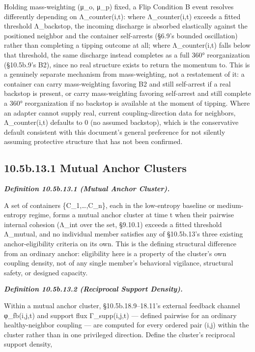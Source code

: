 \documentclass[
]{article}
\begin{document}
Holding mass-weighting (μ\_o, μ\_p) fixed, a Flip Condition B event
resolves differently depending on Λ\_counter(i,t): where Λ\_counter(i,t)
exceeds a fitted threshold Λ\_backstop, the incoming discharge is
absorbed elastically against the positioned neighbor and the container
self-arrests (§6.9's bounded oscillation) rather than completing a
tipping outcome at all; where Λ\_counter(i,t) falls below that
threshold, the same discharge instead completes as a full 360°
reorganization (§10.5b.9's B2), since no real structure exists to return
the momentum to. This is a genuinely separate mechanism from
mass-weighting, not a restatement of it: a container can carry
mass-weighting favoring B2 and still self-arrest if a real backstop is
present, or carry mass-weighting favoring self-arrest and still complete
a 360° reorganization if no backstop is available at the moment of
tipping. Where an adapter cannot supply real, current coupling-direction
data for neighbors, Λ\_counter(i,t) defaults to 0 (no assumed backstop),
which is the conservative default consistent with this document's
general preference for not silently assuming protective structure that
has not been confirmed.

\hypertarget{b.13.1-mutual-anchor-clusters}{%
\subsection{10.5b.13.1 Mutual Anchor
Clusters}\label{b.13.1-mutual-anchor-clusters}}

\emph{\textbf{Definition 10.5b.13.1 (Mutual Anchor Cluster).}}

A set of containers \{C\_1,\ldots,C\_n\}, each in the low-entropy
baseline or medium-entropy regime, forms a mutual anchor cluster at time
t when their pairwise internal cohesion (Λ\_int over the set, §9.10.1)
exceeds a fitted threshold Λ\_mutual, and no individual member satisfies
any of §10.5b.13's three existing anchor-eligibility criteria on its
own. This is the defining structural difference from an ordinary anchor:
eligibility here is a property of the cluster's own coupling density,
not of any single member's behavioral vigilance, structural safety, or
designed capacity.

\emph{\textbf{Definition 10.5b.13.2 (Reciprocal Support Density).}}

Within a mutual anchor cluster, §10.5b.18.9--18.11's external feedback
channel φ\_fb(i,j,t) and support flux Γ\_supp(i,j,t) --- defined
pairwise for an ordinary healthy-neighbor coupling --- are computed for
every ordered pair (i,j) within the cluster rather than in one
privileged direction. Define the cluster's reciprocal support density,
\end{document}
